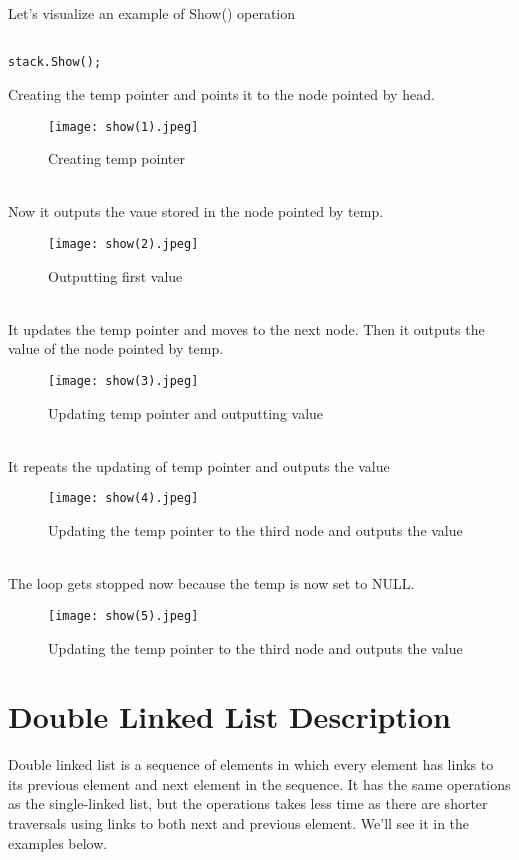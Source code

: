 \documentclass[11pt,fleqn]{book} %
\begin{document}
Let's visualize an example of Show() operation
\begin{example}
\begin{lstlisting}
	
stack.Show();
\end{lstlisting}
Creating the temp pointer and points it to the node pointed by head.
\begin{figure}[H]
	\centering
	\texttt{[image: show(1).jpeg]}
	\caption{Creating temp pointer}
\end{figure} ~\\
Now it outputs the vaue stored in the node pointed by temp.
\begin{figure}[H]
	\centering
	\texttt{[image: show(2).jpeg]}
	\caption{Outputting first value}
\end{figure} ~\\
It updates the temp pointer and moves to the next node. Then it outputs the value of the node pointed by temp.
\begin{figure}[H]
	\centering
	\texttt{[image: show(3).jpeg]}
	\caption{Updating temp pointer and outputting value}
\end{figure} ~\\
It repeats the updating of temp pointer and outputs the value
\begin{figure}[H]
	\centering
	\texttt{[image: show(4).jpeg]}
	\caption{Updating the temp pointer to the third node and outputs the value}
\end{figure} ~\\
The loop gets stopped now because the temp is now set to NULL.
\begin{figure}[H]
	\centering
	\texttt{[image: show(5).jpeg]}
	\caption{Updating the temp pointer to the third node and outputs the value}
\end{figure}
\end{example}

\section{Double Linked List Description}
Double linked list is a sequence of elements in which every element has links to its previous element and next element in the sequence.
It has the same operations as the single-linked list, but the operations takes less time as there are shorter traversals using links to both next and previous element. We'll see it in the examples below.
\end{document}
